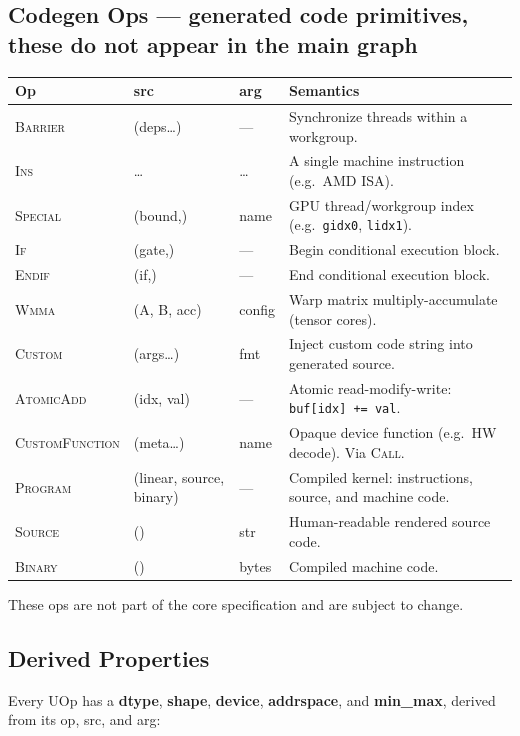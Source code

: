 \documentclass[10pt,letterpaper]{article}
\newcommand{\op}[1]{\textsc{#1}}
\begin{document}
\subsection*{Codegen Ops \normalfont\small--- generated code primitives, these do not appear in the main graph}

\begin{tabular}{@{}l l l l@{}}
\toprule
\textbf{Op} & \textbf{src} & \textbf{arg} & \textbf{Semantics} \\
\midrule
\op{Barrier} & (deps\ldots) & --- & Synchronize threads within a workgroup. \\
\op{Ins} & \ldots & \ldots & A single machine instruction (e.g.\ AMD ISA). \\
\op{Special} & (bound,) & name & GPU thread/workgroup index (e.g.\ \texttt{gidx0}, \texttt{lidx1}). \\
\op{If} & (gate,) & --- & Begin conditional execution block. \\
\op{Endif} & (if,) & --- & End conditional execution block. \\
\op{Wmma} & (A, B, acc) & config & Warp matrix multiply-accumulate (tensor cores). \\
\op{Custom} & (args\ldots) & fmt & Inject custom code string into generated source. \\
\op{AtomicAdd} & (idx, val) & --- & Atomic read-modify-write: \texttt{buf[idx] += val}. \\[4pt]
\op{CustomFunction} & (meta\ldots) & name & Opaque device function (e.g.\ HW decode). Via \op{Call}. \\
\op{Program} & (linear, source, binary) & --- & Compiled kernel: instructions, source, and machine code. \\
\op{Source} & () & str & Human-readable rendered source code. \\
\op{Binary} & () & bytes & Compiled machine code. \\
\bottomrule
\end{tabular}

\smallskip
These ops are not part of the core specification and are subject to change.

\subsection*{Derived Properties}

Every UOp has a \textbf{dtype}, \textbf{shape}, \textbf{device}, \textbf{addrspace}, and \textbf{min\_max}, derived from its op, src, and arg:
\end{document}
